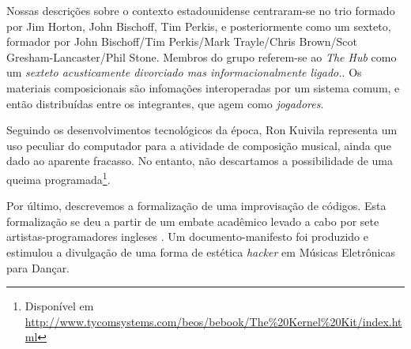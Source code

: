 Nossas descrições sobre o contexto estadounidense centraram-se no trio formado por Jim Horton, John Bischoff, Tim Perkis, e posteriormente como um sexteto, formador por John Bischoff/Tim Perkis/Mark Trayle/Chris Brown/Scot Gresham-Lancaster/Phil Stone. Membros do grupo referem-se ao \emph{The Hub} como um \emph{sexteto acusticamente divorciado mas informacionalmente ligado.}. Os materiais composicionais são infomações interoperadas por um sistema comum, e então distribuídas entre os integrantes, que agem como \emph{jogadores}. 

Seguindo os desenvolvimentos tecnológicos da época, Ron Kuivila representa um uso peculiar do computador para a atividade de composição musical, ainda que dado ao aparente fracasso. No entanto, não descartamos a possibilidade de uma queima programada\footnote{Disponível em \href{http://www.tycomsystems.com/beos/bebook/The\%20Kernel\%20Kit/index.html}{http://www.tycomsystems.com/beos/bebook/The\%20Kernel\%20Kit/index.html}}.

Por último, descrevemos a formalização de uma improvisação de códigos. Esta formalização se deu a partir de um embate acadêmico levado a cabo por sete artistas-programadores ingleses \cite{ward_live_2004}. Um documento-manifesto foi produzido e estimulou a divulgação de uma forma de estética \emph{hacker} em Músicas Eletrônicas para Dançar. 
